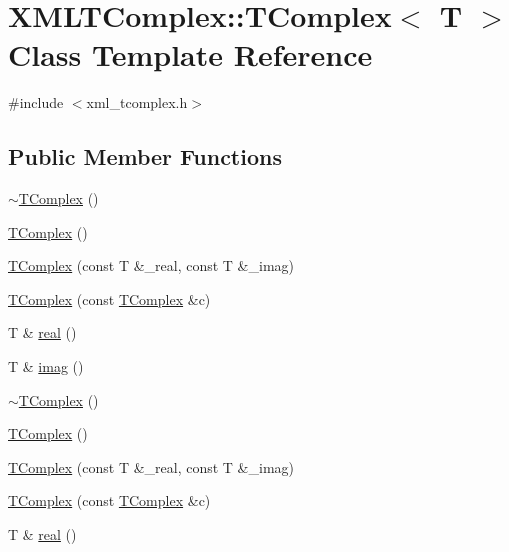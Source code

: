 \hypertarget{classXMLTComplex_1_1TComplex}{}\section{X\+M\+L\+T\+Complex\+:\+:T\+Complex$<$ T $>$ Class Template Reference}
\label{classXMLTComplex_1_1TComplex}


{\ttfamily \#include $<$xml\+\_\+tcomplex.\+h$>$}

\subsection*{Public Member Functions}
\begin{DoxyCompactItemize}
\item 
\mbox{\hyperlink{classXMLTComplex_1_1TComplex_ac5ecd1b7db17431803816caf30e4ddc1}{$\sim$\+T\+Complex}} ()
\item 
\mbox{\hyperlink{classXMLTComplex_1_1TComplex_a14dd2bcde2b707f8040fbf68bf3c0266}{T\+Complex}} ()
\item 
\mbox{\hyperlink{classXMLTComplex_1_1TComplex_a004b4c926f786993fbcc127c01841cd2}{T\+Complex}} (const T \&\+\_\+real, const T \&\+\_\+imag)
\item 
\mbox{\hyperlink{classXMLTComplex_1_1TComplex_a8c19071c0c720ddbcf4232418b8b4a19}{T\+Complex}} (const \mbox{\hyperlink{classXMLTComplex_1_1TComplex}{T\+Complex}} \&c)
\item 
T \& \mbox{\hyperlink{classXMLTComplex_1_1TComplex_a3f7e9b8dd1c6a18da9a944d51d8118c9}{real}} ()
\item 
T \& \mbox{\hyperlink{classXMLTComplex_1_1TComplex_af991451a5500d81f96df2a39d70d7196}{imag}} ()
\item 
\mbox{\hyperlink{classXMLTComplex_1_1TComplex_ac5ecd1b7db17431803816caf30e4ddc1}{$\sim$\+T\+Complex}} ()
\item 
\mbox{\hyperlink{classXMLTComplex_1_1TComplex_a14dd2bcde2b707f8040fbf68bf3c0266}{T\+Complex}} ()
\item 
\mbox{\hyperlink{classXMLTComplex_1_1TComplex_a004b4c926f786993fbcc127c01841cd2}{T\+Complex}} (const T \&\+\_\+real, const T \&\+\_\+imag)
\item 
\mbox{\hyperlink{classXMLTComplex_1_1TComplex_a8c19071c0c720ddbcf4232418b8b4a19}{T\+Complex}} (const \mbox{\hyperlink{classXMLTComplex_1_1TComplex}{T\+Complex}} \&c)
\item 
T \& \mbox{\hyperlink{classXMLTComplex_1_1TComplex_a3f7e9b8dd1c6a18da9a944d51d8118c9}{real}} ()

\end{DoxyCompactItemize}
